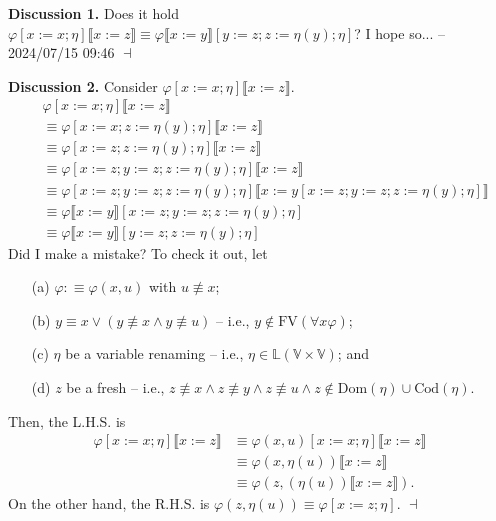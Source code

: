 \documentclass[12pt]{paper}
\newenvironment{context}[1][]
{ \noindent \textbf{{#1}.} }
{ \hfill $ \dashv $ }
\begin{document}
\begin{context}[Discussion 1]
Does it hold $\varphi \left[ x := x ; \eta \right] \llbracket x := z \rrbracket \equiv \varphi \llbracket x := y \rrbracket \left[ y := z ; z := \eta \left( y \right) ; \eta \right]$? \newline
I hope so... -- 2024/07/15 09:46 
\end{context}

\newpage

\begin{context}[Discussion 2]
Consider $\varphi \left[ x := x ; \eta \right] \llbracket x := z \rrbracket$.
\begin{align*}
& \varphi \left[ x := x ; \eta \right] \llbracket x := z \rrbracket \\
& \equiv \varphi \left[ x := x ; z := \eta \left( y \right) ; \eta \right] \llbracket x := z \rrbracket \\
& \equiv \varphi \left[ x := z ; z := \eta \left( y \right) ; \eta \right] \llbracket x := z \rrbracket \\
& \equiv \varphi \left[ x := z ; y := z ; z := \eta \left( y \right) ; \eta \right] \llbracket x := z \rrbracket \\
& \equiv \varphi \left[ x := z ; y := z ; z := \eta \left( y \right) ; \eta \right] \llbracket x := y \left[ x := z ; y := z ; z := \eta \left( y \right) ; \eta \right] \rrbracket \\
& \equiv \varphi \llbracket x := y \rrbracket \left[ x := z ; y := z ; z := \eta \left( y \right) ; \eta \right] \\
& \equiv \varphi \llbracket x := y \rrbracket \left[ y := z ; z := \eta \left( y \right) ; \eta \right]
\end{align*}
Did I make a mistake? To check it out, let
\begin{enumerate}
\item [(a)] $ \varphi : \equiv \varphi \left( x , u \right)$ with $ u \not\equiv x $;
\item [(b)] $ y \equiv x \lor \left( y \not\equiv x \land y \not\equiv u \right) $ -- i.e., $ y \notin \mathrm{FV} \left( \forall x \varphi \right) $;
\item [(c)] $\eta$ be a variable renaming -- i.e., $ \eta \in \mathbb{L} \left( \mathbb{V} \times \mathbb{V} \right) $; and
\item [(d)] $z$ be a fresh -- i.e., $z \not\equiv x \land z \not\equiv y \land z \not\equiv u \land z \notin \mathrm{Dom} \left( \eta \right) \cup \mathrm{Cod} \left( \eta \right)$.
\end{enumerate}
Then, the L.H.S. is
\begin{align*}
\varphi \left[ x := x ; \eta \right] \llbracket x := z \rrbracket
& \equiv \varphi \left( x , u \right) \left[ x := x ; \eta \right] \llbracket x := z \rrbracket \\
& \equiv \varphi \left( x , \eta \left( u \right) \right) \llbracket x := z \rrbracket \\
& \equiv \varphi \left( z , \left( \eta \left( u \right) \right) \llbracket x := z \rrbracket \right) .
\end{align*}
On the other hand, the R.H.S. is $\varphi \left( z , \eta \left( u \right) \right) \equiv \varphi \left[ x := z ; \eta \right]$.
\end{context}
\end{document}
